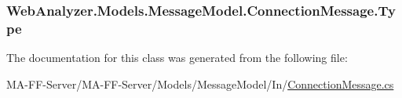 \subsubsection[{Type}]{ Web\+Analyzer.\+Models.\+Message\+Model.\+Connection\+Message.\+Type\hspace{0.3cm}{\ttfamily [get]}}\label{class_web_analyzer_1_1_models_1_1_message_model_1_1_connection_message_a74c569109e3a9d19130c36fa9628a5f5}


The documentation for this class was generated from the following file\+:\begin{DoxyCompactItemize}
\item 
M\+A-\/\+F\+F-\/\+Server/\+M\+A-\/\+F\+F-\/\+Server/\+Models/\+Message\+Model/\+In/\hyperlink{_connection_message_8cs}{Connection\+Message.\+cs}\end{DoxyCompactItemize}

